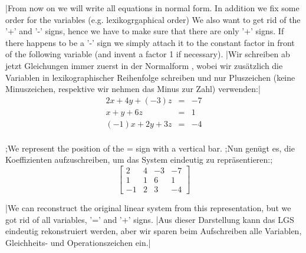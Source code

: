 \tr|From now on we will write all equations in normal form. In addition we fix some order for the variables (e.g. lexikogrgaphical order)
    We also want to get rid of the '+' and '-' signs, hence we have to make sure that there are only '+' signs. If there happens to be a '-' sign we simply
    attach it to the constant factor in front of the following variable (and invent a factor 1 if necessary).
   |Wir schreiben ab jetzt Gleichungen immer zuerst in der \glqq Normalform \grqq,
   wobei wir zusätzlich die Variablen in lexikographischer Reihenfolge schreiben und nur Pluszeichen (keine Minuszeichen, respektive wir nehmen das Minus zur Zahl) verwenden:|
\[
\begin{array}{rcl}
2x+4y+(-3)z&=&-7\\
x+y+6z&=&1\\
(-1)x+2y+3z&=&-4\\
\end{array}
\]
\vsp

\trx;We represent the position of the =  sign with a vertical bar. 
    ;Nun genügt es, die Koeffizienten aufzuschreiben, um das System eindeutig zu repräsentieren:;
\[
\left[\begin{array}{rrr|r}
2&4&-3&-7\\
1&1&6&1\\
-1&2&3&-4
\end{array}\right]
\]

	 
\tr|We can reconstruct the original linear system from this representation, but we got rid of all variables, '=' and  '+' signs. 
   |Aus dieser Darstellung kann das LGS eindeutig rekonstruiert werden, aber wir sparen beim Aufschreiben alle Variablen, Gleichheits- und Operationszeichen ein.|

